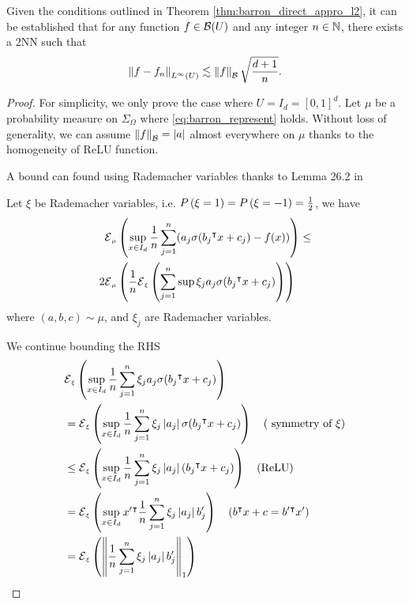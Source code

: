 
\begin{theorem}
    Given the conditions outlined in Theorem \ref{thm:barron_direct_appro_l2},
    it can be established that for any function $f \in \mathcal{B}(U)$ and any
    integer $n \in \mathbb{N}$, there exists a 2NN such that
    \begin{equation}
        \left\| f - f_n \right\|_{L^{\infty}(U)} \lesssim 
        \left\| f \right\|_{\mathcal{B}} \sqrt{\frac{d+1}{n}}.
    \end{equation}
\end{theorem}

\begin{proof}
    For simplicity, we only prove the case where $U = I_d = [0,1]^d$. 
    Let $\mu$ be a probability measure on $\Sigma_{\Omega}$ where
    \eqref{eq:barron_represent} holds. Without loss of generality, we can assume
    $\left\| f \right\|_{\mathcal{B}} = \left| a \right|$ almost everywhere on $\mu$ thanks to the
    homogeneity of ReLU function.

    A bound can found using Rademacher variables thanks to Lemma 26.2 in \cite[
    p. 376]{shalev-shwartzUnderstandingMachineLearning2014}

    Let $\xi$ be Rademacher variables, i.e. $\PR{\xi=1} = \PR{\xi=-1} =
    \frac{1}{2}$, we have
    \begin{align*}
        \label{eq:proof_l_infty_fouier_1}
        &\ERWi{\mu}{\sup_{x\in I_d} 
        \frac{1}{n} \sum_{j=1}^n (a_j\sigma(b_j\tr x + c_j) - f(x))}
        \leq \\
        2& \ERWi{\mu}{
            \frac{1}{n} 
            \ERWi{\xi}{
                \sum_{j=1}^n \sup \xi_j a_j\sigma(b_j\tr x + c_j)
            }
        }
    \end{align*}
    where $(a,b,c)\sim\mu$, and $\xi_j$ are Rademacher variables.

    We continue bounding the RHS
    \begin{align}
        &\ERWi{\xi}{
            \sup_{x\in I_d} \frac{1}{n}\sum_{j=1}^{n} \xi_j a_j\sigma(b_j\tr x + c_j)
        } \\
        &= \ERWi{\xi}{
            \sup_{x\in I_d} \frac{1}{n}\sum_{j=1}^{n} \xi_j \abs{a_j} \sigma(b_j\tr x + c_j)
        } \quad
        (\text{ symmetry of $\xi$}) \\
        &\leq \ERWi{\xi}{
            \sup_{x\in I_d} \frac{1}{n}\sum_{j=1}^{n} \xi_j \abs{a_j}(b_j\tr x + c_j)
        } \quad 
        (\text{ReLU}) \\
        &= \ERWi{\xi}{
            \sup_{x\in I_d} x'\tr \frac{1}{n}\sum_{j=1}^{n} \xi_j \abs{a_j}b_j'
        }
        \quad (b\tr x + c = b'\tr x') \\
        &= \ERWi{\xi}{\norm{
            \frac{1}{n} \sum_{j=1}^{n}\xi_j\abs{a_j}b_j'}_1
        }
    \end{align}


\end{proof}
